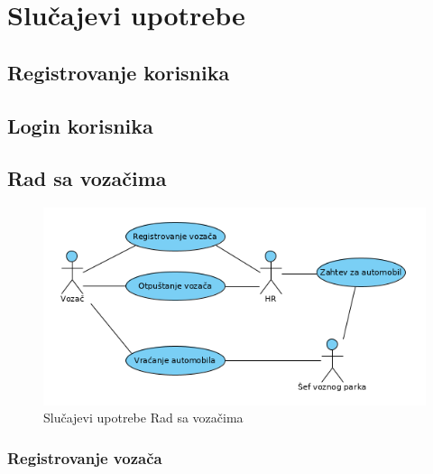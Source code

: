 \section{\bfseries Slu\v cajevi upotrebe}

\subsection{\bfseries Registrovanje korisnika}
\subsection{\bfseries Login korisnika}


\subsection{\bfseries Rad sa vozačima}

\begin{figure}[H]
\begin{center}
\includegraphics[width=\textwidth]{Slike/RadSaVozacimaUseCase.png}
\end{center}
    \caption{Slučajevi upotrebe Rad sa vozačima}
\label{fig:contextDiagram}
\end{figure}


\subsubsection{\bfseries Registrovanje vozača}

